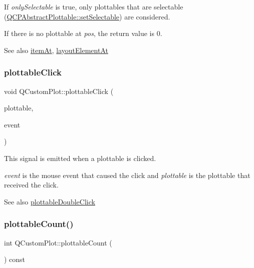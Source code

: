 If {\itshape only\+Selectable} is true, only plottables that are selectable (\hyperlink{class_q_c_p_abstract_plottable_a22c69299eb5569e0f6bf084877a37dc4}{Q\+C\+P\+Abstract\+Plottable\+::set\+Selectable}) are considered.

If there is no plottable at {\itshape pos}, the return value is 0.

\begin{DoxySeeAlso}{See also}
\hyperlink{class_q_custom_plot_ac08578e0e6c059c83a8d340ba0038e8e}{item\+At}, \hyperlink{class_q_custom_plot_afaa1d304e0287d140fd238e90889ef3c}{layout\+Element\+At} 
\end{DoxySeeAlso}
\hypertarget{class_q_custom_plot_a57e5efa8a854620e9bf62d31fc139f53}{}\label{class_q_custom_plot_a57e5efa8a854620e9bf62d31fc139f53} 
\subsubsection{\texorpdfstring{plottable\+Click}{plottableClick}}
{\footnotesize\ttfamily void Q\+Custom\+Plot\+::plottable\+Click (\begin{DoxyParamCaption}\item[{\hyperlink{class_q_c_p_abstract_plottable}{Q\+C\+P\+Abstract\+Plottable} $\ast$}]{plottable,  }\item[{Q\+Mouse\+Event $\ast$}]{event }\end{DoxyParamCaption})\hspace{0.3cm}{\ttfamily [signal]}}

This signal is emitted when a plottable is clicked.

{\itshape event} is the mouse event that caused the click and {\itshape plottable} is the plottable that received the click.

\begin{DoxySeeAlso}{See also}
\hyperlink{class_q_custom_plot_af2e6f1cea923dae437681d01ce7d0c31}{plottable\+Double\+Click} 
\end{DoxySeeAlso}
\hypertarget{class_q_custom_plot_a5f4f15991c14bf9ad659bb2a19dfbed4}{}\label{class_q_custom_plot_a5f4f15991c14bf9ad659bb2a19dfbed4} 
\subsubsection{\texorpdfstring{plottable\+Count()}{plottableCount()}}
{\footnotesize\ttfamily int Q\+Custom\+Plot\+::plottable\+Count (\begin{DoxyParamCaption}{ }\end{DoxyParamCaption}) const}

